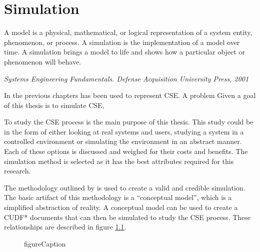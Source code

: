\chapter{Simulation}
\label{simulation}
\epigraph{A model is a physical, mathematical, or logical representation of a system entity, phenomenon, or process. 
A simulation is the implementation of a model over time. 
A simulation brings a model to life and shows how a particular object or phenomenon will behave.}
{\textit{Systems Engineering Fundamentals. Defense Acquisition University Press, 2001}}

In the previous chapters \modelname has been used to represent CSE.
A problem 
Given a goal of this thesis is to simulate CSE,

To study the CSE process is the main purpose of this thesis.
This study could be in the form of either looking at real systems and users, studying a system in a controlled environment or simulating the environment in an abstract manner.
Each of these options is discussed and weighed for their costs and benefits.
The simulation method is selected as it has the best attributes required for this research.

The methodology outlined by \cite{Law2005} is used to create a valid and credible simulation.
The basic artifact of this methodology is a ``conceptual model'', which is a simplified abstraction of reality.
A conceptual model can be used to create a CUDF* documents that can then be simulated to study the CSE process.
These relationships are described in figure \ref{sim.modeldiagram}.



\begin{figure}[htp]
\begin{center}
  \caption[labelInTOC]{figureCaption}
  \label{sim.modeldiagram}
\end{center}
\end{figure}




